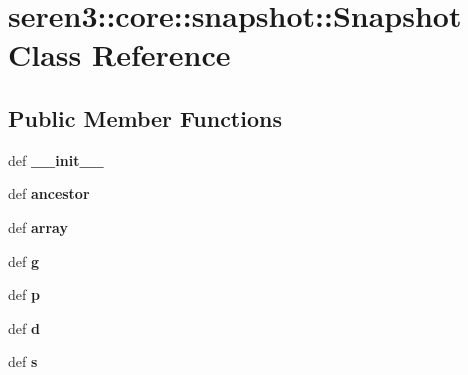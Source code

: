 \hypertarget{classseren3_1_1core_1_1snapshot_1_1Snapshot}{
\section{seren3::core::snapshot::Snapshot Class Reference}
\label{classseren3_1_1core_1_1snapshot_1_1Snapshot}
}
\subsection*{Public Member Functions}
\begin{DoxyCompactItemize}
\item 
\hypertarget{classseren3_1_1core_1_1snapshot_1_1Snapshot_a767b7e97ef31c4bb396c7363146e64ae}{
def {\bfseries \_\-\_\-init\_\-\_\-}}
\label{classseren3_1_1core_1_1snapshot_1_1Snapshot_a767b7e97ef31c4bb396c7363146e64ae}

\item 
\hypertarget{classseren3_1_1core_1_1snapshot_1_1Snapshot_aafc229a0ba31a4a656850a17d954c7e8}{
def {\bfseries ancestor}}
\label{classseren3_1_1core_1_1snapshot_1_1Snapshot_aafc229a0ba31a4a656850a17d954c7e8}

\item 
\hypertarget{classseren3_1_1core_1_1snapshot_1_1Snapshot_a5a1da82693de6edeacd93b2768255152}{
def {\bfseries array}}
\label{classseren3_1_1core_1_1snapshot_1_1Snapshot_a5a1da82693de6edeacd93b2768255152}

\item 
\hypertarget{classseren3_1_1core_1_1snapshot_1_1Snapshot_a4e4ae511968d9ff3dc681c9cb544bea2}{
def {\bfseries g}}
\label{classseren3_1_1core_1_1snapshot_1_1Snapshot_a4e4ae511968d9ff3dc681c9cb544bea2}

\item 
\hypertarget{classseren3_1_1core_1_1snapshot_1_1Snapshot_a116264bbb8659529b76de2a9007579ae}{
def {\bfseries p}}
\label{classseren3_1_1core_1_1snapshot_1_1Snapshot_a116264bbb8659529b76de2a9007579ae}

\item 
\hypertarget{classseren3_1_1core_1_1snapshot_1_1Snapshot_af78e314cff6fade963194b2af0e1bafb}{
def {\bfseries d}}
\label{classseren3_1_1core_1_1snapshot_1_1Snapshot_af78e314cff6fade963194b2af0e1bafb}

\item 
\hypertarget{classseren3_1_1core_1_1snapshot_1_1Snapshot_a724cf73d288c058c59a76f5d27956248}{
def {\bfseries s}}
\label{classseren3_1_1core_1_1snapshot_1_1Snapshot_a724cf73d288c058c59a76f5d27956248}


\end{DoxyCompactItemize}
